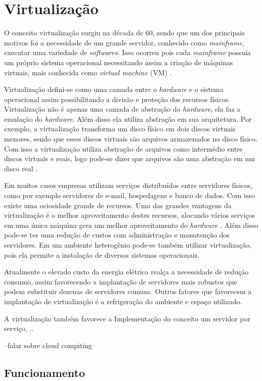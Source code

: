 \chapter{Virtualização}
O conceito virtualização surgiu na década de 60, sendo que um dos principais motivos foi a necessidade de um grande servidor,
conhecido como \textit{mainframe}, executar uma variedade de \textit{softwares}. Isso ocorreu pois cada \textit{mainframe} possuía
um próprio sistema operacional necessitando assim a criação de máquinas virtuais, mais conhecida como \textit{virtual machine} (VM) \cite{carissimi2008}.

Virtualização defini-se como uma camada entre o \textit{hardware} e o sistema operacional assim possibilitando a divisão e proteção
dos recursos físicos. Virtualização não é apenas uma camada de abstração do \textit{hardware}, ela faz a emulação do \textit{hardware}.
Além disso ela utiliza abstração em sua arquitetura. Por exemplo, a virtualização transforma um disco físico em dois discos virtuais menores, 
sendo que esses discos virtuais são arquivos armazenados no disco físico. Com isso a virtualização utiliza abstração de arquivos como 
intermédio entre discos virtuais e reais, logo pode-se dizer que arquivos são uma abstração em um disco real \cite{smithenair2005}. 

Em muitos casos empresas utilizam serviços distribuídos entre servidores físicos, como por exemplo servidores de e-mail, hospedagens e 
banco de dados. Com isso existe uma ociosidade grande de recursos. Uma das grandes vantagens da virtualização é o melhor aproveitamento
destes recursos, alocando vários serviços em uma única máquina gera um melhor aproveitamento do \textit{hardware} \cite{moreira2006}.
Além disso pode-se ter uma redução de custos com administração e manutenção dos servidores. Em um ambiente heterogênio pode-se também
utilizar virtualização, pois ela permite a instalação de diversos sistemas operacionais.

Atualmente o elevado custo da energia elétrica realça a necessidade de redução consumo, assim favorecendo a implantação de servidores
mais robustos que podem substituir dezenas de servidores comuns. Outros fatores que favorecem a implantação de virtualização é a 
refrigeração do ambiente e espaço utilizado.

A virtualização também favorece a Implementação do conceito um servidor por serviço, ..

--falar sobre cloud compiting
 
 
\section{Funcionamento}



